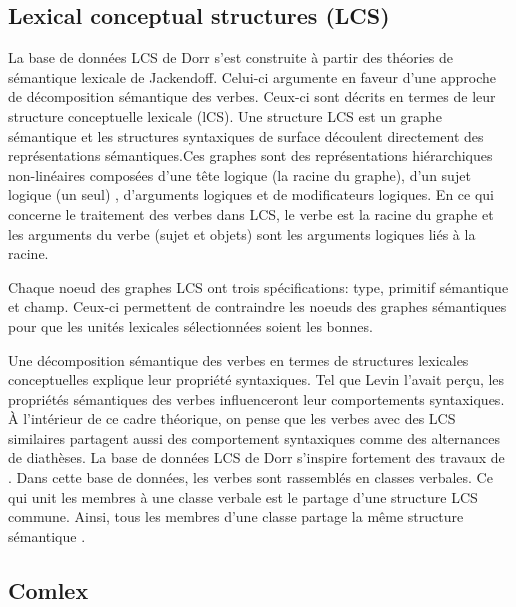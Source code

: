 \subsection{Lexical conceptual structures (LCS)}
La base de données LCS de Dorr s'est construite à partir des théories de sémantique lexicale de Jackendoff. Celui-ci argumente en faveur d'une approche de décomposition sémantique des verbes. Ceux-ci sont décrits en termes de leur structure conceptuelle lexicale (lCS)\citep{DorrUseLexicalSemantics1992}. Une structure LCS est un graphe sémantique et les structures syntaxiques de surface découlent directement des représentations sémantiques.Ces graphes sont des représentations hiérarchiques non-linéaires composées d'une tête logique (la racine du graphe), d'un sujet logique (un seul) , d'arguments logiques et de modificateurs logiques. En ce qui concerne le traitement des verbes dans LCS, le verbe est la racine du graphe et les arguments du verbe (sujet et objets) sont les arguments logiques liés à la racine.

Chaque noeud des graphes LCS ont trois spécifications: type, primitif sémantique et champ. Ceux-ci permettent de contraindre les noeuds des graphes sémantiques pour que les unités lexicales sélectionnées soient les bonnes.

Une décomposition sémantique des verbes en termes de structures lexicales conceptuelles explique leur propriété syntaxiques. Tel que Levin l'avait perçu, les propriétés sémantiques des verbes influenceront leur comportements syntaxiques. À l'intérieur de ce cadre théorique, on pense que les verbes avec des LCS similaires partagent aussi des comportement syntaxiques comme des alternances de diathèses. La base de données LCS de Dorr s'inspire fortement des travaux de \cite{verb-classes.levin.1993}. Dans cette base de données, les verbes sont rassemblés en classes verbales. Ce qui unit les membres à une classe verbale est le partage d'une structure LCS commune. Ainsi, tous les membres d'une classe partage la même structure sémantique \citep{TraumGenerationLexicalConceptual2000}.

\subsection{Comlex}\label{comlex}

